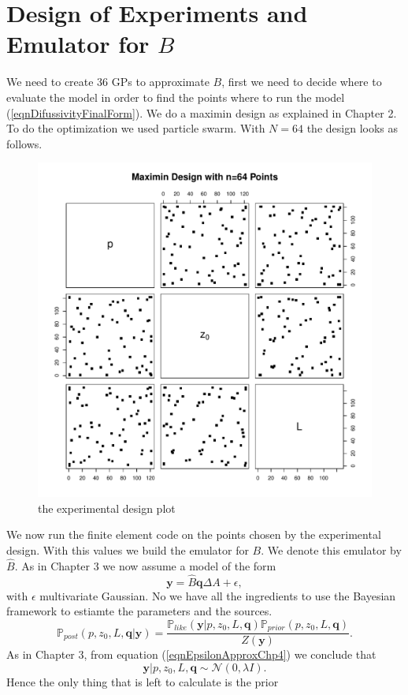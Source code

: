 \documentclass[12pt]{book}
\newcommand{\post}{\mathbb{P}_{post}}
\newcommand{\like}{\mathbb{P}_{like}}
\newcommand{\prior}{\mathbb{P}_{prior}}
\newcommand{\q}{\textbf{q}}
\newcommand{\pars}{p,z_{0},L}
\newcommand{\y}{\textbf{y}}
\begin{document}
\section{Design of Experiments and Emulator for $B$}
We need to create 36 GPs to approximate $B$, first we need to decide where to evaluate the model in order
to find the points where to run the model (\ref{eqnDifussivityFinalForm}). We do a maximin design
as explained in Chapter 2. To do the optimization we used particle swarm. With $N=64$ the design looks as follows.
\begin{figure}[H]
\centering
\includegraphics[scale=0.6]{./FigChap4/experimentalDesign64}
\caption{the experimental design plot}
\end{figure}
We now run the finite element code on the points chosen by the experimental design. With this
values we build the emulator for $B$. We denote this emulator by $\widehat{B}$. As
in Chapter 3 we now assume a model of the form
\begin{equation}\label{eqnEpsilonApproxChp4}
\y=\widehat{B}\textbf{q}\Delta A+\epsilon,
\end{equation}
with $\epsilon$ multivariate Gaussian. No we have all the ingredients to use 
the Bayesian framework to estiamte the parameters and the sources. 
\begin{equation*}
\post(p,z_{0},L,\q|\y)=\frac{\like(\y|p,z_{0},L,\q)\prior(p,z_{0},L,\q)}{Z(\y)}.
\end{equation*}
As in Chapter 3, from equation (\ref{eqnEpsilonApproxChp4}) we conclude that
\begin{equation*}
\y|\pars,\q\sim\mathcal{N}(0,\lambda I).
\end{equation*}
Hence the only thing that is left to calculate is the prior
\end{document}
